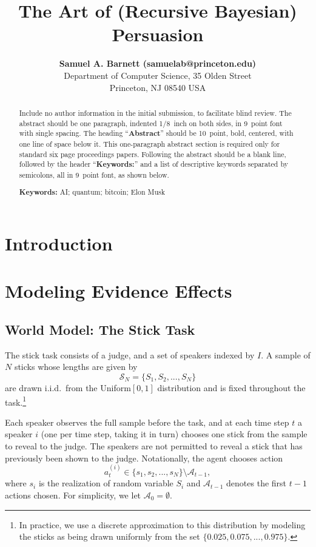 \documentclass[10pt,letterpaper]{article}
\title{The Art of (Recursive Bayesian) Persuasion}
\author{{\large \bf Samuel A. Barnett (samuelab@princeton.edu)} \\
  Department of Computer Science, 35 Olden Street \\
  Princeton, NJ 08540 USA}
\begin{document}
\maketitle


\begin{abstract}
Include no author information in the initial submission, to facilitate
blind review.  The abstract should be one paragraph, indented 1/8~inch on both sides,
in 9~point font with single spacing. The heading ``{\bf Abstract}''
should be 10~point, bold, centered, with one line of space below
it. This one-paragraph abstract section is required only for standard
six page proceedings papers. Following the abstract should be a blank
line, followed by the header ``{\bf Keywords:}'' and a list of
descriptive keywords separated by semicolons, all in 9~point font, as
shown below.

\textbf{Keywords:} 
AI; quantum; bitcoin; Elon Musk
\end{abstract}

\section{Introduction}

\section{Modeling Evidence Effects}
\subsection{World Model: The Stick Task}
The stick task consists of a judge, and a set of speakers indexed by $I$. 
A sample of $N$ sticks whose lengths are given by
\begin{equation}
\mathcal{S}_N = \{ S_1, S_2, ..., S_N \}
\end{equation}
are drawn i.i.d.\ from the Uniform$[0,1]$ distribution and is fixed throughout
the task.\footnote{In practice, we use a discrete approximation to this distribution 
by modeling the sticks as being drawn uniformly from the set $\{ 0.025, 0.075, ..., 0.975\}$.} 

Each speaker observes the full sample before the task, and at each time step $t$ a speaker
$i$ (one per time step, taking it in turn) chooses one stick from the sample to reveal
to the judge. The speakers are not permitted to reveal a stick that has previously been shown to 
the judge. Notationally, the agent chooses action 
\begin{equation}
a_t^{(i)} \in \{s_1, s_2, ..., s_N\} \setminus \mathcal{A}_{t-1},
\end{equation}
where $s_i$ is the realization of random variable $S_i$ and $\mathcal{A}_{t-1}$ denotes the first
$t-1$ actions chosen. For simplicity, we let $\mathcal{A}_0 = \emptyset$.
\end{document}
